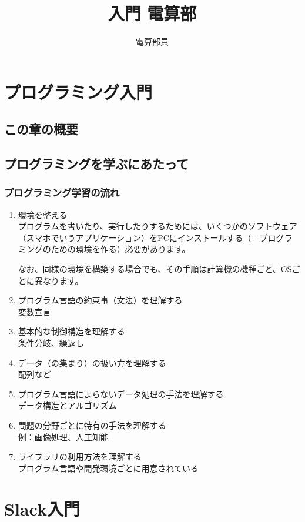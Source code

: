 \documentclass[lualatex,ja=standard,12pt,a4j]{bxjsbook}
\title{入門 電算部}
\author{電算部員}
\begin{document}
	\tableofcontents
	\chapter{プログラミング入門}
		\section{この章の概要}
		\section{プログラミングを学ぶにあたって}
			\subsection{プログラミング学習の流れ}
			\begin{enumerate}
				\item 環境を整える\\
				プログラムを書いたり、実行したりするためには、いくつかのソフトウェア（スマホでいうアプリケーション）をPCにインストールする（＝プログラミングのための環境を作る）必要があります。
                
				なお、同様の環境を構築する場合でも、その手順は計算機の機種ごと、OSごとに異なります。
				
				\item プログラム言語の約束事（文法）を理解する\\
				変数宣言
			
				\item 基本的な制御構造を理解する\\
				条件分岐、繰返し
				
				\item データ（の集まり）の扱い方を理解する\\
				配列など
				
				\item プログラム言語によらないデータ処理の手法を理解する\\
				データ構造とアルゴリズム
				
				\item 問題の分野ごとに特有の手法を理解する\\
				例：画像処理、人工知能
				
				\item ライブラリの利用方法を理解する\\
				プログラム言語や開発環境ごとに用意されている
			\end{enumerate}
	\chapter{Slack入門}
\end{document}
